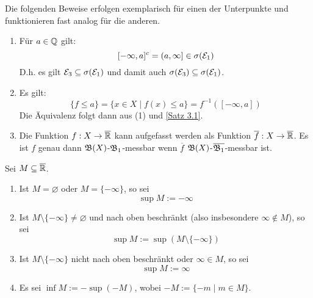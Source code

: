 \documentclass[a4paper,twoside,DIV15,BCOR12mm,chapterprefix=true,headings=onelinechapter]{scrbook}
\begin{document}
\begin{beweis}
Die folgenden Beweise erfolgen exemplarisch für einen der Unterpunkte und funktionieren fast analog für die anderen.
\begin{enumerate}
\item Für $a\in\mathbb{Q}$ gilt:
\[[-\infty,a]^c=(a,\infty]\in\sigma(\mathcal{E}_1)\]
D.h. es gilt $\mathcal{E}_3\subseteq\sigma(\mathcal{E}_1)$ und damit auch $\sigma(\mathcal{E}_3)\subseteq\sigma(\mathcal{E}_1)$.
\item Es gilt:
\[\{f\le a\}=\{x\in X\mid f(x)\le a\}=f^{-1}([-\infty,a])\]
Die Äquivalenz folgt dann aus (1) und \ref{Satz 3.1}.
\item Die Funktion $f:X\to\overline{\mathbb{R}}$ kann aufgefasst werden als Funktion $\overline{f}:X\to\overline{\mathbb{R}}$. Es ist $f$ genau dann $\mathfrak{B}(X)$-$\mathfrak{B}_1$-messbar wenn $\overline{f}$ $\mathfrak{B}(X)$-$\overline{\mathfrak{B}_1}$-messbar ist. 
\end{enumerate}
\end{beweis}

\begin{definition}
Sei $M\subseteq\overline{\mathbb{R}}$.
\begin{enumerate}
\item Ist $M=\varnothing$ oder $M=\{-\infty\}$, so sei 
\[\sup M:=-\infty\]
\item Ist $M\setminus\{-\infty\}\ne\varnothing$ und nach oben beschränkt (also insbesondere $\infty\not\in M$), so sei 
\[\sup M:= \sup (M\setminus\{-\infty\})\]
\item Ist $M\setminus\{-\infty\}$ nicht nach oben beschränkt oder $\infty\in M$, so sei 
\[\sup M:=\infty\]
\item Es sei $\inf M:=-\sup(-M)$, wobei $-M:=\{-m\mid m\in M\}$.
\end{enumerate}
\end{definition}
\end{document}
